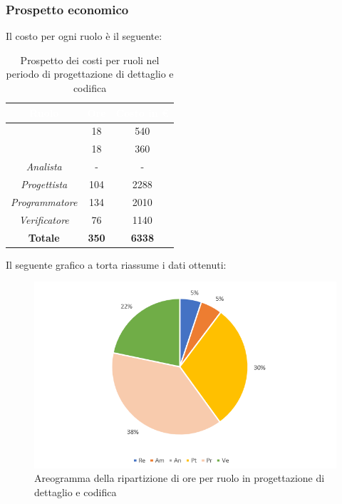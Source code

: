 \subsubsection{Prospetto economico}
Il costo per ogni ruolo è il seguente:
\begin{table}[H]
	\begin{center}
		\begin{tabular}{ |c c c| }
		\rowcolor{darkblue} 
		\textcolor{white}{\textbf{Ruolo}} & \textcolor{white}{\textbf{Ore}} & \textcolor{white}{\textbf{Costo in €}}\\ \hline
		{\Responsabile} 			& 18 	& 540 \\ \hline
		{\Amministratore}		 	& 18 	& 360 \\ \hline
		\textit{Analista} 			& - 	& - \\ \hline
		\textit{Progettista} 		& 104 	& 2288 \\ \hline
		\textit{Programmatore}  	& 134 	& 2010 \\ \hline
		\textit{Verificatore} 		& 76 	& 1140 \\ \hline
		\textbf{Totale} & \textbf{350} & \textbf{6338} \\ \hline
		\end{tabular}
	\caption{Prospetto dei costi per ruoli nel periodo di progettazione di dettaglio e codifica}
	\end{center}
\end{table}
Il seguente grafico a torta riassume i dati ottenuti:
\begin{figure}[H]
    \centering
    \includegraphics[scale = 0.75]{Immagini/DettaglioTorta.png}
    \caption{Areogramma della ripartizione di ore per ruolo in progettazione di dettaglio e codifica}
    \label{fig:Areogramma ripartizione ore, periodo di Progettazione di Dettaglio e Codifica}
\end{figure}
\newpage

